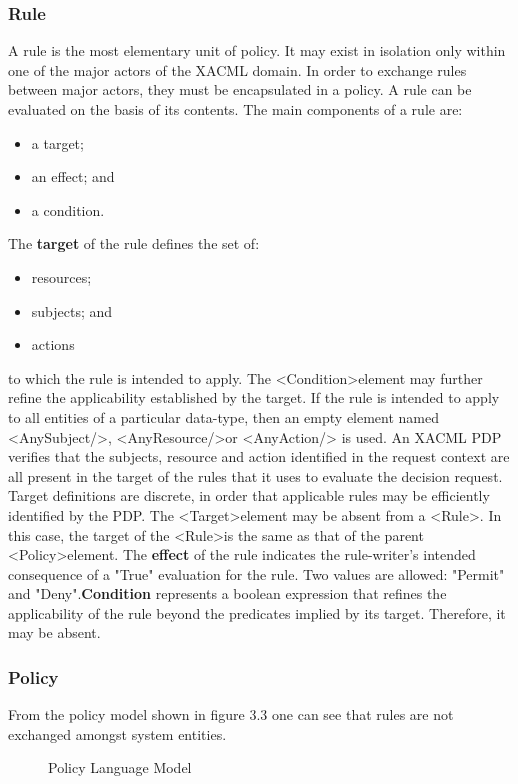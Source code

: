 \subsubsection{Rule}
\hspace{5mm}A rule is the most elementary unit of policy. It may exist in isolation only within one of the major actors of the XACML domain. In order to exchange rules between major actors, they must be
encapsulated in a policy. A rule can be evaluated on the basis of its contents. The main
components of a rule are:
\begin{itemize}
\item a target;
\item an effect; and
\item a condition.
\end{itemize}
The \textbf{target} of the rule defines the set of:
\begin{itemize}
\item resources;
\item subjects; and
\item actions
\end{itemize}
to which the rule is intended to apply. The \textless Condition\textgreater   element may further refine the
applicability established by the target. If the rule is intended to apply to all entities of a particular
data-type, then an empty element named \textless AnySubject/\textgreater  , \textless AnyResource/\textgreater   or \textless AnyAction/\textgreater  
is used. An XACML PDP verifies that the subjects, resource and action identified in the request
context are all present in the target of the rules that it uses to evaluate the decision request.
Target definitions are discrete, in order that applicable rules may be efficiently identified by the
PDP.
The \textless Target\textgreater   element may be absent from a \textless Rule\textgreater  . In this case, the target of the \textless Rule\textgreater   is
the same as that of the parent \textless Policy\textgreater   element.
The \textbf{effect} of the rule indicates the rule-writer's intended consequence of a "True" evaluation for the rule. Two values are allowed: "Permit" and "Deny".\textbf{Condition} represents a boolean expression that refines the applicability of the rule beyond the predicates implied by its target. Therefore, it may be absent.

\subsubsection{Policy}
\hspace{5mm}From the policy model shown in figure 3.3 one can see that rules are not exchanged amongst system entities.
\begin{figure}[h!]
\begin{center}
\end{center}
\caption {Policy Language Model}
\label{vmb2}
\vspace{0mm}
\end{figure}

